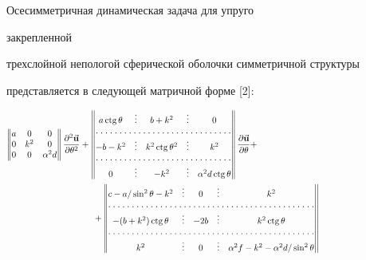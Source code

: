\begin{exam} Осесимметричная динамическая задача для упруго 


закрепленной 


трехслойной непологой сферической оболочки симметричной структуры 


представляется в следующей матричной форме [2]: 


\begin{gather} 


\begin{Vmatrix} 


a & 0 & 0 \\ 0 & k^2 & 0 \\ 0 & 0 & \alpha^2 d 


\end{Vmatrix} 


\frac{\partial^2\vb{u}}{\partial\theta^2}+


\begin{Vmatrix} 


a\ctg\theta & \vdots & b+k^2 & \vdots & 0 \\ 


\hdotsfor[1.5]{5} \\ 


-b-k^2 & \vdots & k^2\ctg\theta^2 & \vdots & k^2 \\ 


\hdotsfor[1.5]{5} \\ 


0 & \vdots & -k^2 & \vdots & \alpha^2d\ctg\theta 


\end{Vmatrix} 


\frac{\partial\vb{u}}{\partial\theta}+\hspace{60mm}\notag\\ 


% 


+ 


\begin{Vmatrix} 


c-a/\sin^2\theta-k^2 & \vdots & 0 & \vdots & k^2 \\ 


\hdotsfor[1.5]{5} \\ 


-(b+k^2)\ctg\theta & \vdots & -2b & \vdots & k^2\ctg\theta \\ 


\hdotsfor[1.5]{5} \\ 


k^2 & \vdots & 0 & \vdots & \alpha^2f-k^2-\alpha^2d/\sin^2\theta 



\end{Vmatrix}
\end{gather}
\end{exam}
